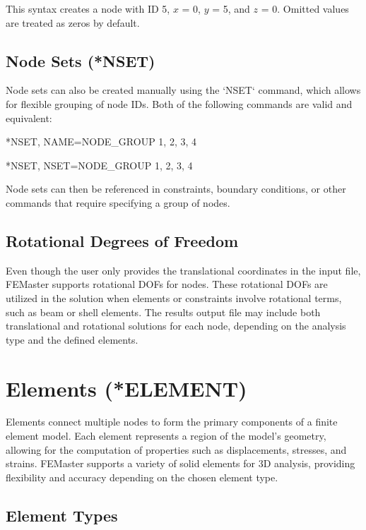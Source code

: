 This syntax creates a node with ID 5, $x$ = 0, $y$ = 5, and $z$ = 0. Omitted values are treated as zeros by default.

\subsection{Node Sets (*NSET)}
Node sets can also be created manually using the `NSET` command, which allows for flexible grouping of node IDs.
Both of the following commands are valid and equivalent:

\begin{codeBlock}
*NSET, NAME=NODE_GROUP
1, 2, 3, 4
\end{codeBlock}

\begin{codeBlock}
*NSET, NSET=NODE_GROUP
1, 2, 3, 4
\end{codeBlock}

Node sets can then be referenced in constraints, boundary conditions, or other commands that require specifying a group of nodes.

\subsection{Rotational Degrees of Freedom}
Even though the user only provides the translational coordinates in the input file, FEMaster supports rotational DOFs for nodes. These rotational DOFs are utilized in the solution when elements or constraints involve rotational terms, such as beam or shell elements. The results output file may include both translational and rotational solutions for each node, depending on the analysis type and the defined elements.

\newpage








\section{Elements (*ELEMENT)}

Elements connect multiple nodes to form the primary components of a finite element model. Each element represents a region of the model's geometry, allowing for the computation of properties such as displacements, stresses, and strains. FEMaster supports a variety of solid elements for 3D analysis, providing flexibility and accuracy depending on the chosen element type.


\subsection{Element Types}

